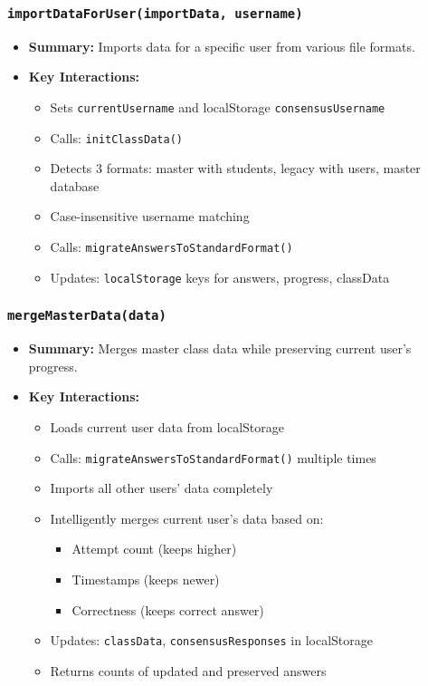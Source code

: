 \documentclass[11pt,letterpaper]{article}
\begin{document}
\subsubsection{\texttt{importDataForUser(importData, username)}}
\begin{itemize}
    \item \textbf{Summary:} Imports data for a specific user from various file formats.
    \item \textbf{Key Interactions:}
    \begin{itemize}
        \item Sets \texttt{currentUsername} and localStorage \texttt{consensusUsername}
        \item Calls: \texttt{initClassData()}
        \item Detects 3 formats: master with students, legacy with users, master database
        \item Case-insensitive username matching
        \item Calls: \texttt{migrateAnswersToStandardFormat()}
        \item Updates: \texttt{localStorage} keys for answers, progress, classData
    \end{itemize}
\end{itemize}

\subsubsection{\texttt{mergeMasterData(data)}}
\begin{itemize}
    \item \textbf{Summary:} Merges master class data while preserving current user's progress.
    \item \textbf{Key Interactions:}
    \begin{itemize}
        \item Loads current user data from localStorage
        \item Calls: \texttt{migrateAnswersToStandardFormat()} multiple times
        \item Imports all other users' data completely
        \item Intelligently merges current user's data based on:
        \begin{itemize}
            \item Attempt count (keeps higher)
            \item Timestamps (keeps newer)
            \item Correctness (keeps correct answer)
        \end{itemize}
        \item Updates: \texttt{classData}, \texttt{consensusResponses} in localStorage
        \item Returns counts of updated and preserved answers
    \end{itemize}
\end{itemize}
\end{document}

